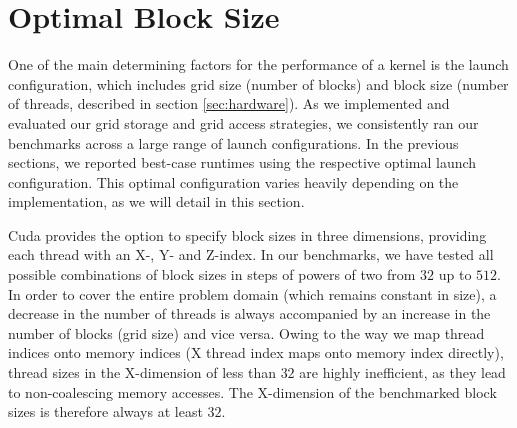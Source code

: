 \section{Optimal Block Size} \label{sec:res-blocksize}



One of the main determining factors for the performance of a kernel is the launch configuration, which includes grid size (number of blocks) and block size (number of threads, described in section \ref{sec:hardware}). As we implemented and evaluated our grid storage and grid access strategies, we consistently ran our benchmarks across a large range of launch configurations. In the previous sections, we reported best-case runtimes using the respective optimal launch configuration. This optimal configuration varies heavily depending on the implementation, as we will detail in this section.

Cuda provides the option to specify block sizes in three dimensions, providing each thread with an X-, Y- and Z-index. In our benchmarks, we have tested all possible combinations of block sizes in steps of powers of two from $32$ up to $512$. In order to cover the entire problem domain (which remains constant in size), a decrease in the number of threads is always accompanied by an increase in the number of blocks (grid size) and vice versa. Owing to the way we map thread indices onto memory indices (X thread index maps onto memory index directly), thread sizes in the X-dimension of less than $32$ are highly inefficient, as they lead to non-coalescing memory accesses. The X-dimension of the benchmarked block sizes is therefore always at least $32$.


